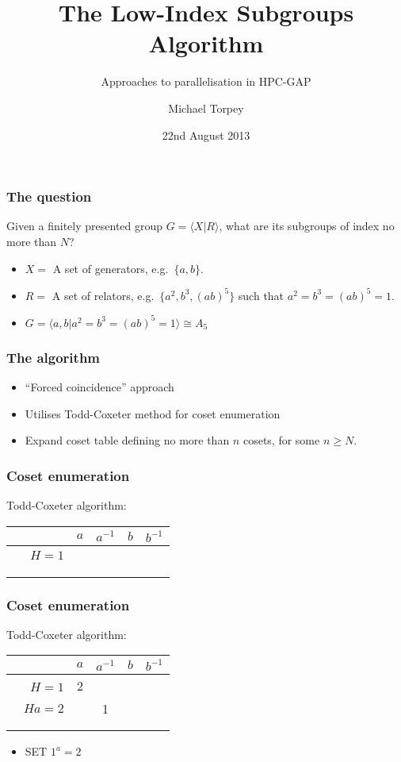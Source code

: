 \documentclass{beamer}
\title{The Low-Index Subgroups Algorithm}
\subtitle{Approaches to parallelisation in HPC-GAP}
\author{Michael Torpey}
\institute{University of St Andrews}
\date{22nd August 2013}
\begin{document}
\maketitle

\begin{frame}
  \frametitle{The question}
  Given a finitely presented group $G = \langle X | R \rangle$, what are its subgroups of index no more than $N$?
  \begin{itemize}
  \item<2-> $X = $ A set of generators, e.g.~$\{a,b\}$.
  \item<3-> $R = $ A set of relators, e.g.~$\{a^2,b^3,(ab)^5\}$ such that $a^2=b^3=(ab)^5=1$.
  \item<4-> $G = \langle a,b | a^2=b^3=(ab)^5=1\rangle \cong A_5$
  \end{itemize}
\end{frame}

\begin{frame}
  \frametitle{The algorithm}
  \begin{itemize}
  \item ``Forced coincidence'' approach
  \item Utilises Todd-Coxeter method for coset enumeration
  \item Expand coset table defining no more than $n$ cosets, for some $n \geq N$.
  \end{itemize}
\end{frame}

\begin{frame}[t]
  \frametitle{Coset enumeration}
  \pause
  Todd-Coxeter algorithm:
  \pause
  \begin{table}
    \begin{tabular}{r | c c c c}
      & $a$ & $a^{-1}$ & $b$ & $b^{-1}$ \\ \hline
      $\phantom{b^{-1}}H=1$ & & & \phantom{3} & \\ \\ \\ \\
    \end{tabular}
  \end{table}

\end{frame}

\begin{frame}[t]
  \frametitle{Coset enumeration}
  Todd-Coxeter algorithm:
  \begin{table}
    \begin{tabular}{r | c c c c}
      & $a$ & $a^{-1}$ & $b$ & $b^{-1}$ \\ \hline
      $\phantom{b^{-1}}H=1$ & 2 & & \phantom{3} & \\
      $Ha=2$ & & 1 & & \\ \\ \\
    \end{tabular}
  \end{table}

  \begin{itemize}
  \item SET $1^a=2$
  \end{itemize}
\end{frame}
\end{document}
